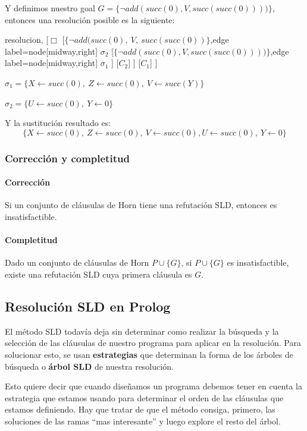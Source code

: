 Y definimos nuestro goal $G = \{\lnot add(succ(0),V,succ(succ(0))))\}$, entonces una resolución posible es la siguiente:

\begin{center}
	\begin{forest} resolucion,
[$\Box$ 
	[$\{\lnot add(succ(0){,}~V{,}~succ(succ(0))\}$,edge label={node[midway,right] {$\sigma_2$}}
    	[$\{\lnot add(succ(0){,}V{,}succ(succ(0))))\}$,edge label={node[midway,right] {$\sigma_1$}}
    	]
    	[$C_2$]	
	]
    [$C_1$]
]
	\end{forest}
\end{center}

$\sigma_1 = \{ X\leftarrow succ(0),~Z\leftarrow succ(0),~ V\leftarrow succ(Y)\}$

$\sigma_2 = \{ U\leftarrow succ(0),~Y\leftarrow 0\}$

Y la sustitución resultado es: $$\{ X\leftarrow succ(0),~Z\leftarrow succ(0),~ V\leftarrow succ(0),U\leftarrow succ(0),~Y\leftarrow 0\}$$

\subsubsection{Corrección y completitud}

\paragraph{Corrección} Si un conjunto de cláusulas de Horn tiene una refutación SLD, entonces es insatisfactible.

\paragraph{Completitud} Dado un conjunto de cláusulas de Horn $P\cup \{G\}$, si $P\cup \{G\}$ es insatisfactible, existe una refutación SLD cuya primera cláusula es $G$.

\subsection{Resolución SLD en Prolog}
El método SLD todavía deja sin determinar como realizar la búsqueda y la selección de las cláusulas de nuestro programa para aplicar en la resolución. Para solucionar esto, se usan \textbf{estrategias} que determinan la forma de los árboles de búsqueda o \textbf{árbol SLD} de nuestra resolución.


Esto quiere decir que cuando diseñamos un programa debemos tener en cuenta la estrategia que estamos usando para determinar el orden de las cláusulas que estamos definiendo. Hay que tratar de que el método consiga, primero, las soluciones de las ramas ``mas interesante'' y luego explore el resto del árbol.

